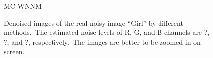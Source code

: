 \begin{figure}
{\begin{minipage}[t]{0.19\textwidth}
{\footnotesize MC-WNNM }
\end{minipage}
}
    \caption{Denoised images of the real noisy image ``Girl'' \cite{ncwebsite} by different methods.\ The estimated noise levels of R, G, and B channels are ?, ?, and ?, respectively.\ The images are better to be zoomed in on screen.}
    \label{fig4-10}
\end{figure}


\begin{figure}
    \centering
{}
\end{figure}
